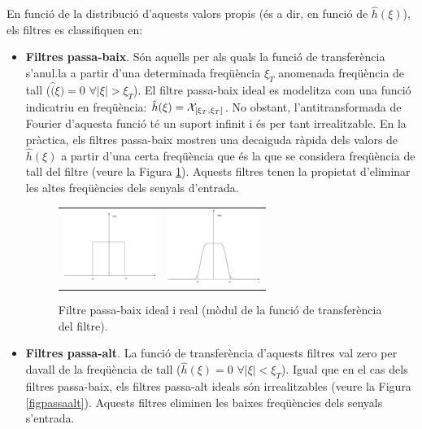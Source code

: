 \documentclass{article}
\begin{document}
En funci\'o de la distribuci\'o d'aquests valors propis (\'es a dir, en funci\'o de $\hat{h}(\xi)$),
els filtres es classifiquen en:
\begin{itemize}
\item {\bf Filtres passa-baix}. S\'on aquells per als quals la funci\'o de transfer\`encia 
s'anul.la a partir d'una determinada freq\"u\`encia $\xi_T$ anomenada freq\"u\`encia de
tall ($\hat(\xi)=0$ $\forall |\xi| > \xi_T$). El filtre passa-baix ideal es modelitza com
una funci\'o indicatriu en freq\"u\`encia: $\hat{h}(\xi)={\cal X}_{[\xi_T, \xi_T]}$. No obstant,
l'antitransformada de Fourier d'aquesta funci\'o t\'e un suport infinit i \'es per tant
irrealitzable. En la pr\`actica, els filtres passa-baix mostren una decaiguda r\`apida dels valors
de $\hat{h}(\xi)$ a partir d'una certa freq\"u\`encia que \'es la que se considera freq\"u\`encia
de tall del filtre (veure la Figura \ref{figpassabaix}). Aquests filtres tenen la propietat 
d'eliminar les altes freq\"u\`encies dels senyals d'entrada.

\begin{figure}[htbp]
\begin{center}
\begin{tabular}{cc}
\includegraphics[width=3cm]{imatges/passabaixideal.eps} &
\includegraphics[width=3cm]{imatges/passabaixreal.eps}
\end{tabular}
\caption{Filtre passa-baix ideal i real (m\`odul de la funci\'o de transfer\`encia del filtre).}
\label{figpassabaix}
\end{center}
\end{figure}

\item {\bf Filtres passa-alt}. La funci\'o de transfer\`encia d'aquests filtres val zero per
davall de la freq\"u\`encia de tall ($\hat{h}(\xi)=0$ $\forall |\xi| < \xi_T$). Igual que 
en el cas dels filtres passa-baix, els filtres passa-alt ideals s\'on irrealitzables
(veure la Figura \ref{figpassaalt}). Aquests filtres eliminen les baixes freq\"u\`encies
dels senyals s'entrada.


\end{itemize}
\end{document}
